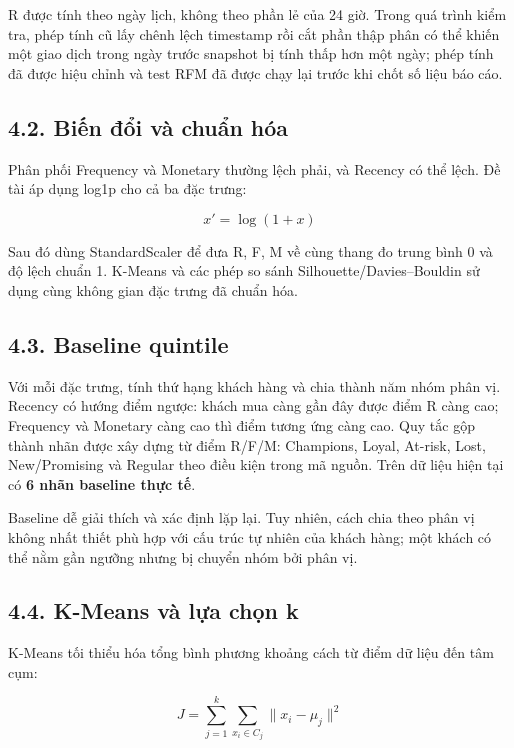 \documentclass[a4paper]{article}
\begin{document}
R được tính theo ngày lịch, không theo phần lẻ của 24 giờ. Trong quá trình kiểm tra, phép tính cũ lấy chênh lệch timestamp rồi cắt phần thập phân có thể khiến một giao dịch trong ngày trước snapshot bị tính thấp hơn một ngày; phép tính đã được hiệu chỉnh và test RFM đã được chạy lại trước khi chốt số liệu báo cáo.

\subsection*{4.2. Biến đổi và chuẩn hóa}

Phân phối Frequency và Monetary thường lệch phải, và Recency có thể lệch. Đề tài áp dụng log1p cho cả ba đặc trưng:

\[
x' = \log(1+x)
\]

Sau đó dùng StandardScaler để đưa R, F, M về cùng thang đo trung bình 0 và độ lệch chuẩn 1. K-Means và các phép so sánh Silhouette/Davies--Bouldin sử dụng cùng không gian đặc trưng đã chuẩn hóa.

\subsection*{4.3. Baseline quintile}

Với mỗi đặc trưng, tính thứ hạng khách hàng và chia thành năm nhóm phân vị. Recency có hướng điểm ngược: khách mua càng gần đây được điểm R càng cao; Frequency và Monetary càng cao thì điểm tương ứng càng cao. Quy tắc gộp thành nhãn được xây dựng từ điểm R/F/M: Champions, Loyal, At-risk, Lost, New/Promising và Regular theo điều kiện trong mã nguồn. Trên dữ liệu hiện tại có \textbf{6 nhãn baseline thực tế}.

Baseline dễ giải thích và xác định lặp lại. Tuy nhiên, cách chia theo phân vị không nhất thiết phù hợp với cấu trúc tự nhiên của khách hàng; một khách có thể nằm gần ngưỡng nhưng bị chuyển nhóm bởi phân vị.

\subsection*{4.4. K-Means và lựa chọn k}

K-Means tối thiểu hóa tổng bình phương khoảng cách từ điểm dữ liệu đến tâm cụm:

\[
J = \sum_{j=1}^{k} \sum_{x_i \in C_j} \lVert x_i-\mu_j\rVert^2
\]
\end{document}
